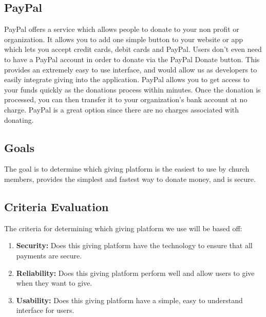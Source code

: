 \documentclass[letterpaper,10pt,draftclsnofoot,onecolumn,titlepage]{IEEEtran}
\begin{document}
	\subsection{PayPal}
		PayPal offers a service which allows people to donate to your non profit or organization. \cite{PayPal}
		It allows you to add one simple button to your website or app which lets you accept credit cards, debit cards and PayPal.
		Users don't even need to have a PayPal account in order to donate via the PayPal Donate button.
		This provides an extremely easy to use interface, and would allow us as developers to easily integrate giving into the application.
		PayPal allows you to get access to your funds quickly as the donations process within minutes.
		Once the donation is processed, you can then transfer it to your organization's bank account at no charge.
		PayPal is a great option since there are no charges associated with donating.

	\subsection{Goals}
		The goal is to determine which giving platform is the easiest to use by church members, provides the simplest and fastest way to donate money, and is secure.

	\subsection{Criteria Evaluation}
		The criteria for determining which giving platform we use will be based off:
		\begin{enumerate}
			\item \textbf{Security:} Does this giving platform have the technology to ensure that all payments are secure.
			\item \textbf{Reliability:} Does this giving platform perform well and allow users to give when they want to give.
			\item \textbf{Usability:} Does this giving platform have a simple, easy to understand interface for users.
		\end{enumerate}
\end{document}
